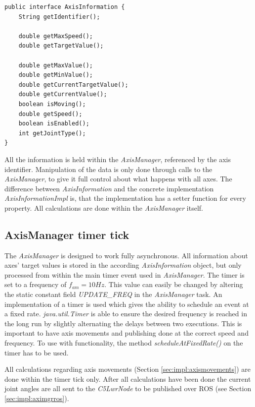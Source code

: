 \begin{lstlisting}[caption={The AxisInformation interface}, label=lst:impl:axisinformation]
public interface AxisInformation {
	String getIdentifier();
	
	double getMaxSpeed();
	double getTargetValue();
	
	double getMaxValue();
	double getMinValue();
	double getCurrentTargetValue();
	double getCurrentValue();
	boolean isMoving();
	double getSpeed();
	boolean isEnabled();
	int getJointType();
}
\end{lstlisting}

All the information is held within the \textit{AxisManager}, referenced by the axis identifier. Manipulation of the data is only done through calls to the \textit{AxisManager}, to give it full control about what happens with all axes. The difference between \textit{AxisInformation} and the concrete implementation \textit{AxisInformationImpl} is, that the implementation has a setter function for every property. All calculations are done within the \textit{AxisManager} itself.

\subsection{AxisManager timer tick}

The \textit{AxisManager} is designed to work fully asynchronous. All information about axes' target values is stored in the according \textit{AxisInformation} object, but only processed from within the main timer event used in \textit{AxisManager}. The timer is set to a frequency of $f_{am} = 10Hz$. This value can easily be changed by altering the static constant field \textit{UPDATE\_FREQ} in the \textit{AxisManager} task. An implementation of a timer is used which gives the ability to schedule an event at a fixed rate. \textit{java.util.Timer} is able to ensure the desired frequency is reached in the long run by slightly alternating the delays between two executions\cite{AndroidTimer2018}. This is important to have axis movements and publishing done at the correct speed and frequency. To use with functionality, the method \textit{scheduleAtFixedRate()} on the timer has to be used. 

All calculations regarding axis movements (Section \ref{sec:impl:axismovements}) are done within the timer tick only. After all calculations have been done the current joint angles are all sent to the \textit{C5LwrNode} to be published over ROS (see Section \ref{sec:impl:aximgrros}).

